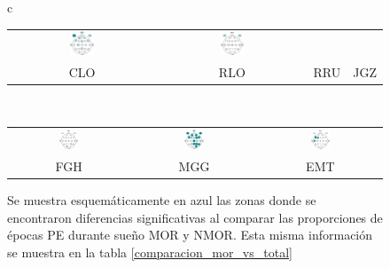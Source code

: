 \documentclass[12pt,a4paper]{mitthesis}
\begin{document}
\begin{figure}
\begin{tabular}{c}
\begin{tabular}{cccc}
\includegraphics[width=0.17\textwidth]{./cabecitas/cabecita_RRU.pdf} &
\includegraphics[width=0.17\textwidth]{./cabecitas/cabecita_JGZ.pdf} \\
CLO & RLO & RRU & JGZ
\end{tabular}
\\
\begin{tabular}{ccc}
\includegraphics[width=0.17\textwidth]{./cabecitas/cabecita_FGH.pdf} &
\includegraphics[width=0.17\textwidth]{./cabecitas/cabecita_MGG.pdf} &
\includegraphics[width=0.17\textwidth]{./cabecitas/cabecita_EMT.pdf} \\
FGH & MGG & EMT
\end{tabular}
\end{tabular}
\caption{Se muestra esquem\'aticamente en azul las zonas donde se encontraron diferencias 
significativas al comparar las proporciones de \'epocas PE durante sue\~no MOR y NMOR. Esta misma
informaci\'on se muestra en la tabla \ref{comparacion_mor_vs_total} }
\label{cabecitas_munchas}
\end{figure}
\end{document}
